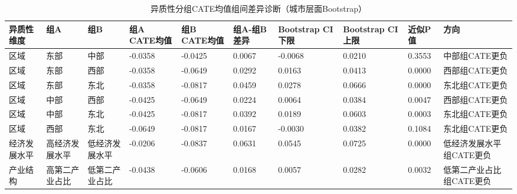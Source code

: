 \begin{table}
\caption{异质性分组CATE均值组间差异诊断（城市层面Bootstrap）}
\label{tab:heterogeneity_group_differences}
\begin{tabular}{llllllllll}
\toprule
异质性维度 & 组A & 组B & 组A CATE均值 & 组B CATE均值 & 组A-组B差异 & Bootstrap CI下限 & Bootstrap CI上限 & 近似P值 & 方向 \\
\midrule
区域 & 东部 & 中部 & -0.0358 & -0.0425 & 0.0067 & -0.0068 & 0.0210 & 0.3553 & 中部组CATE更负 \\
区域 & 东部 & 西部 & -0.0358 & -0.0649 & 0.0292 & 0.0163 & 0.0413 & 0.0000 & 西部组CATE更负 \\
区域 & 东部 & 东北 & -0.0358 & -0.0817 & 0.0459 & 0.0278 & 0.0666 & 0.0000 & 东北组CATE更负 \\
区域 & 中部 & 西部 & -0.0425 & -0.0649 & 0.0224 & 0.0064 & 0.0384 & 0.0047 & 西部组CATE更负 \\
区域 & 中部 & 东北 & -0.0425 & -0.0817 & 0.0392 & 0.0189 & 0.0603 & 0.0003 & 东北组CATE更负 \\
区域 & 西部 & 东北 & -0.0649 & -0.0817 & 0.0167 & -0.0030 & 0.0382 & 0.1084 & 东北组CATE更负 \\
经济发展水平 & 高经济发展水平 & 低经济发展水平 & -0.0206 & -0.0837 & 0.0631 & 0.0545 & 0.0725 & 0.0000 & 低经济发展水平组CATE更负 \\
产业结构 & 高第二产业占比 & 低第二产业占比 & -0.0438 & -0.0606 & 0.0168 & 0.0057 & 0.0282 & 0.0032 & 低第二产业占比组CATE更负 \\
\bottomrule
\end{tabular}
\end{table}
